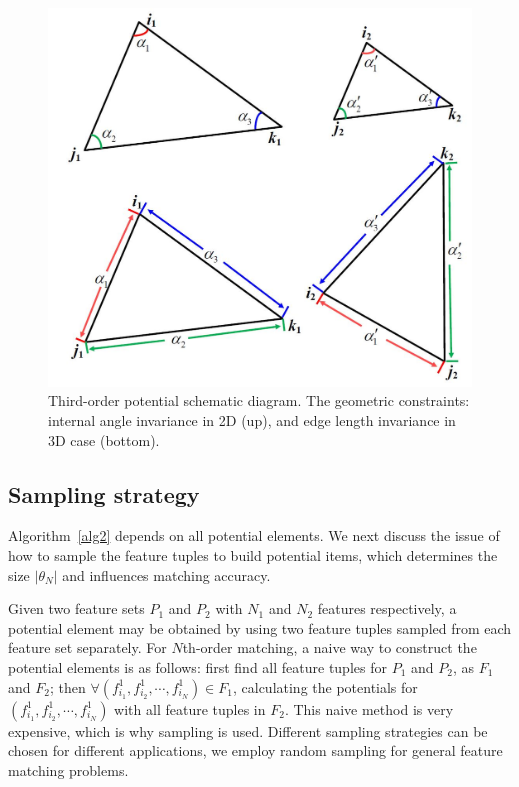 \begin{figure}
\centering
  \includegraphics[width=0.8\linewidth]{figures/diagram.jpg}
  \caption{Third-order potential schematic diagram. The geometric constraints: internal angle invariance in 2D (up), and edge length invariance in 3D case (bottom).}
\label{fig:TO}
\end{figure}

\subsection{Sampling strategy}
\label{subsec:sampling}

Algorithm~\ref{alg2} depends on all potential elements.
We next discuss the issue of how to sample the feature tuples to build potential items, which determines the size $|\theta_N|$ and influences matching accuracy.

Given two feature sets $P_1$ and $P_2$ with $N_1$ and $N_2$ features respectively,
a potential element may be obtained by using two feature tuples sampled from each feature set separately.
For $N$th-order matching, a naive way to construct the potential elements is as follows:
first find all feature tuples for $P_1$ and $P_2$, as $F_1$ and $F_2$; then $\forall (f_{i_1}^1, f_{i_2}^1, \cdots, f_{i_N}^1)\in F_1$,
calculating the potentials for $(f_{i_1}^1, f_{i_2}^1, \cdots, f_{i_N}^1)$ with all feature tuples in $F_2$.
This naive method is very expensive, which is why sampling is used.
Different sampling strategies can be chosen for different applications,
we employ random sampling for general feature matching problems.

